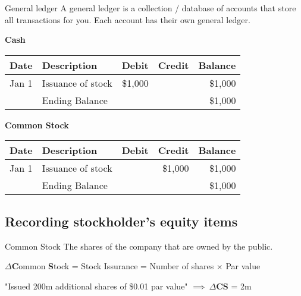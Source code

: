 \begin{definition}
    {General ledger}
    A general ledger is a collection / database of accounts that store all transactions for you. Each account has their own general ledger.
    \label{def:gl}
\end{definition}

\small
\begin{tcolorbox}[colframe=black,colback=white,title=Example General Ledger]
    \textbf{Cash} \\
    \begin{tabular}{llrrr}
        Date  & Description       & Debit   & Credit & Balance \\
        \hline
        Jan 1 & Issuance of stock & \$1,000 &        & \$1,000 \\
        \hline
              & Ending Balance    &         &        & \$1,000 \\
    \end{tabular}

    \vspace{0.5em}
    \textbf{Common Stock}\\
    \begin{tabular}{llrrr}
        Date  & Description       & Debit & Credit  & Balance \\
        \hline
        Jan 1 & Issuance of stock &       & \$1,000 & \$1,000 \\
        \hline
              & Ending Balance    &       &         & \$1,000 \\
    \end{tabular}
\end{tcolorbox}
\normalsize

\subsection{Recording stockholder's equity items}

\begin{knBox}
    {Common Stock}
    The shares of the company that are owned by the public.
    \begin{center}
        $\Delta$\textbf{C}ommon \textbf{S}tock = Stock Issurance = Number of shares $\times$ Par value
    \end{center}
    \tcblower
    "Issued 200m additional shares of \$0.01 par value" $\implies\ \Delta$\textbf{CS} = 2m
    \label{def:cs}
\end{knBox}

